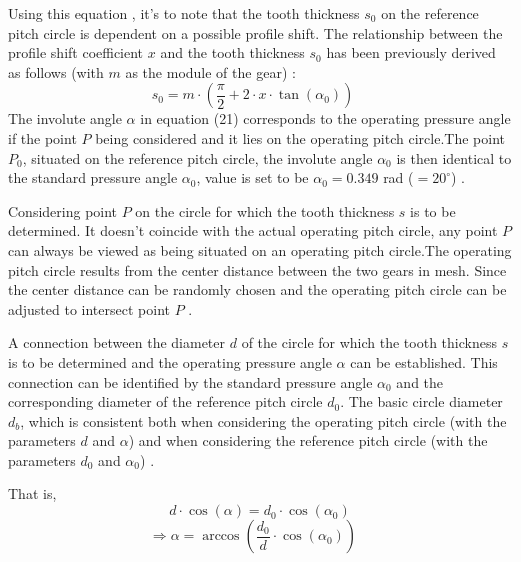 \documentclass{article}
\begin{document}
Using this equation , it's to note that the tooth thickness \( s_0 \) on the reference pitch circle is dependent on a possible profile shift. The relationship between the profile shift coefficient \( x \) and the tooth thickness \( s_0 \) has been previously derived as follows (with \( m \) as the module of the gear) \cite{Calculation-of-involute-gears-6}:
\begin{equation}
    s_0 = m \cdot \left( \frac{\pi}{2} + 2 \cdot x \cdot \tan(\alpha_0) \right) \quad 
\end{equation}
The involute angle \( \alpha \) in equation (21) corresponds to the operating pressure angle if the point \( P \) being considered and it lies on the operating pitch circle.The point \( P_0 \), situated on the reference pitch circle, the involute angle \( \alpha_0 \) is then identical to the standard pressure angle \( \alpha_0 \), value is set to be \( \alpha_0 = 0.349 \) rad (\( =20^\circ \)) \cite{Calculation-of-involute-gears-6}. 

Considering point \( P \) on the circle for which the tooth thickness \( s \) is to be determined. It doesn't coincide with the actual operating pitch circle, any point \( P \) can always be viewed as being situated on an operating pitch circle.The operating pitch circle results from the center distance between the two gears in mesh. Since the center distance can be randomly chosen and the operating pitch circle can be adjusted to intersect point \( P \) \cite{Calculation-of-involute-gears-6}.

A connection between the diameter \( d \) of the circle for which the tooth thickness \( s \) is to be determined and the operating pressure angle \( \alpha \) can be established. This connection can be identified by the standard pressure angle \( \alpha_0 \) and the corresponding diameter of the reference pitch circle \( d_0 \). The  basic circle diameter \( d_b \), which is consistent both when considering the operating pitch circle (with the parameters \( d \) and \( \alpha \)) and when considering the reference pitch circle (with the parameters \( d_0 \) and \( \alpha_0 \)) \cite{Calculation-of-involute-gears-6}.

That is,
\begin{equation}
     d \cdot \cos(\alpha) = d_0 \cdot \cos(\alpha_0) 
\end{equation}
\begin{equation}
    \Rightarrow \alpha = \arccos\left(\frac{d_0}{d} \cdot \cos(\alpha_0)\right) \quad 
\end{equation}
\end{document}
